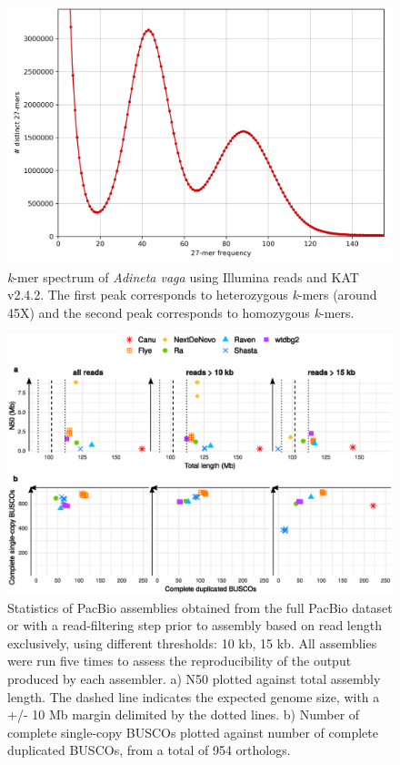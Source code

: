    \begin{figure}[ht]
    \centering
     \includegraphics[width=13.5cm]{fig/benchmark/avaga_lab_kat.hist.png}
   \caption{\textit{k}-mer spectrum of \textit{Adineta vaga} using Illumina reads and KAT v2.4.2. The first peak corresponds to heterozygous \textit{k}-mers (around 45X) and the second peak corresponds to homozygous \textit{k}-mers.}
   \label{fig:kmer_spectrum}
 \end{figure}

   \begin{figure}[ht]
    \centering
     \includegraphics[width=13.5cm]{fig/benchmark/supp_pacbio_replicates.eps}
   \caption{Statistics of PacBio assemblies obtained from the full PacBio dataset or with a read-filtering step prior to assembly based on read length exclusively, using different thresholds: 10 kb, 15 kb. All assemblies were run five times to assess the reproducibility of the output produced by each assembler. a) N50 plotted against total assembly length. The dashed line indicates the expected genome size, with a +/- 10 Mb margin delimited by the dotted lines. b) Number of complete single-copy BUSCOs plotted against number of complete duplicated BUSCOs, from a total of 954 orthologs.}
   \label{fig:pacbio_replicates}
 \end{figure}
 
